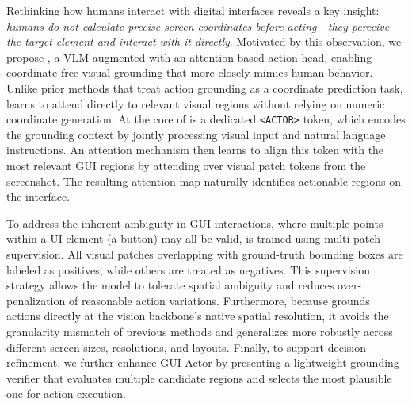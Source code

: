 Rethinking how humans interact with digital interfaces reveals a key insight: \textit{humans do not calculate precise screen coordinates before acting—they perceive the target element and interact with it directly}. Motivated by this observation, we propose \sys, a VLM augmented with an attention-based action head, enabling coordinate-free visual grounding that more closely mimics human behavior. Unlike prior methods that treat action grounding as a coordinate prediction task, \sys learns to attend directly to relevant visual regions without relying on numeric coordinate generation. At the core of \sys is a dedicated \texttt{<ACTOR>} token, which encodes the grounding context by jointly processing visual input and natural language instructions. An attention mechanism then learns to align this token with the most relevant GUI regions by attending over visual patch tokens from the screenshot. The resulting attention map naturally identifies actionable regions on the interface.

To address the inherent ambiguity in GUI interactions, where multiple points within a UI element (\eg a button) may all be valid, \sys is trained using multi-patch supervision. All visual patches overlapping with ground-truth bounding boxes are labeled as positives, while others are treated as negatives. This supervision strategy allows the model to tolerate spatial ambiguity and reduces over-penalization of reasonable action variations. Furthermore, because \sys grounds actions directly at the vision backbone's native spatial resolution, it avoids the granularity mismatch of previous methods and generalizes more robustly across different screen sizes, resolutions, and layouts. Finally, to support decision refinement, we further enhance GUI-Actor by presenting a lightweight grounding verifier that evaluates multiple candidate regions and selects the most plausible one for action execution.

